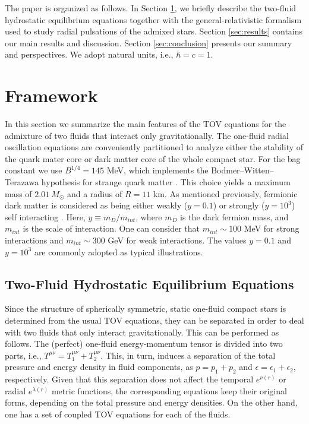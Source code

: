 \documentclass[universe,article,accept,moreauthors,pdftex]{Definitions/mdpi}
\begin{document}
The paper is organized as follows. In Section \ref{sec:framework}, we briefly describe the two-fluid hydrostatic equilibrium equations together with the general-relativistic formalism used to study radial pulsations of the admixed stars. Section \ref{sec:results} contains our main results and discussion. Section \ref{sec:conclusion} presents our summary and perspectives. We adopt natural units, i.e., $\hbar=c=1$.
 
\section{Framework}
	\label{sec:framework}

In this section we summarize the main features of the TOV equations for the admixture of two fluids that interact only gravitationally. The one-fluid radial oscillation equations are conveniently partitioned to analyze either the stability of the quark mater core or dark matter core of the whole compact star. For the bag constant we use $B^{1/4}=145$ MeV, which  implements the Bodmer--Witten--Terazawa hypothesis for strange quark matter \cite{Schaffner-Bielich:2020psc}. This choice yields a maximum mass of $2.01~M_{\odot}$ and a radius of $R=11$ km. As mentioned previously, fermionic dark matter is considered as being either weakly ($y=0.1$) or strongly ($y=10^{3}$) self interacting \cite{Narain:2006kx}. Here, $y\equiv m_D/m_{int}$, where $m_D$ is the dark fermion mass, and $m_{int}$ is the scale of interaction. One can consider that $m_{int} \sim 100$ MeV for strong interactions and $m_{int} \sim 300$ GeV for weak interactions. The values $y=0.1$ and $y=10^{3}$ are commonly adopted as typical illustrations.
  
\subsection{Two-Fluid Hydrostatic Equilibrium Equations}

Since the structure of spherically symmetric, static one-fluid compact stars is determined from the usual TOV equations, they can be separated in order to deal with two fluids that only interact gravitationally. This can be performed as follows. The (perfect) one-fluid energy-momentum tensor is divided into two parts, i.e., $T^{\mu\nu}=T^{\mu\nu}_{1}+T^{\mu\nu}_{2}$. This, in turn, induces a separation of the total pressure and energy density in fluid components, as $p=p_{1}+p_{2}$ and $\epsilon=\epsilon_{1}+\epsilon_{2}$, respectively. Given that this separation does not affect the temporal $e^{\nu(r)}$ or radial $e^{\lambda(r)}$ metric functions, the corresponding equations keep their original forms, depending on the total pressure and energy densities. On the other hand, one has a set of coupled TOV equations for each of the fluids. 
\end{document}
